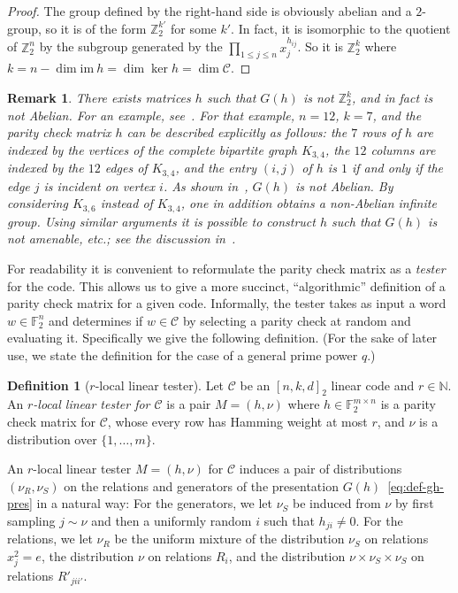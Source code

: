 \documentclass[11pt]{article}
\newtheorem{remark}[theorem]{Remark}
\theoremstyle{definition}
\newtheorem{definition}[theorem]{Definition}
\newcommand{\code}{\mathscr{C}}
\newcommand{\N}{\ensuremath{\mathbb{N}}}
\newcommand{\F}{\ensuremath{\mathbb{F}}}
\newcommand{\Z}{\ensuremath{\mathbb{Z}}}
\begin{document}
\begin{proof}
The group defined by the right-hand side is obviously abelian and a $2$-group, so it is of the form $\Z_2^{k'}$ for some $k'$. In fact, it is isomorphic to the quotient of $\Z_2^n$ by the subgroup generated by the $\prod_{1\leq j \leq n} x_j^{h_{ij}}$. So it is $\Z_2^k$ where $k=n-\dim\textrm{im}\ h = \dim\ker h=\dim \code$.  
\end{proof}

\begin{remark}\label{rk:non-abelian}
There exists matrices $h$ such that $G(h)$ is not $\Z_2^k$, and in fact is not Abelian. For an example, see~\cite[Example 2.16]{paddock2022arkhipov}. For that example, $n=12$, $k=7$, and the parity check matrix $h$ can be described explicitly as follows: the $7$ rows of $h$ are indexed by the vertices of the complete bipartite graph $K_{3,4}$, the $12$ columns are indexed by the $12$ edges of $K_{3,4}$, and the entry $(i,j)$ of $h$ is $1$ if and only if the edge $j$ is incident on vertex $i$. As shown in~\cite{paddock2022arkhipov}, $G(h)$ is not Abelian. By considering $K_{3,6}$ instead of $K_{3,4}$, one in addition obtains a non-Abelian \emph{infinite} group. Using similar arguments it is possible to construct $h$ such that $G(h)$ is not amenable, etc.; see the discussion in~\cite[Section 6]{paddock2022arkhipov}.
\end{remark}


For readability it is convenient to reformulate the parity check matrix as a \emph{tester} for the code. This allows us to give a more succinct, ``algorithmic'' definition of a parity check matrix for a given code. Informally, the tester takes as input a word $w\in \F_2^n$ and determines if $w\in \code$ by selecting a parity check at random and evaluating it. 
 Specifically we give the following definition. (For the sake of later use, we state the definition for the case of a general prime power $q$.)

\begin{definition}[$r$-local linear tester]\label{def:code-test}
Let $\code$ be an $[n,k,d]_2$ linear code and $r\in \N$.
An \emph{$r$-local linear tester for $\code$} is a pair $M = (h,\nu)$ where $h \in \F_2^{m \times n}$ is a parity check matrix for $\code$, whose every row has Hamming weight at most $r$, and $\nu$ is a distribution over $\{1,\ldots,m\}$. 
\end{definition}

An $r$-local linear tester $M=(h,\nu)$ for $\code$ induces a pair of distributions $(\nu_R,\nu_S)$ on the relations and generators of the presentation $G(h)$~\eqref{eq:def-gh-pres} in a natural way: For the generators, we let $\nu_S$ be induced from $\nu$ by first sampling $j\sim \nu$ and then a uniformly random $i$ such that $h_{ji}\neq 0$. For the relations, we let $\nu_R$ be the uniform mixture of the distribution $\nu_S$ on relations $x_j^2=e$, the distribution $\nu$ on relations $R_i$, and the distribution $\nu\times \nu_S\times \nu_S$ on relations $R'_{jii'}$.
\end{document}
